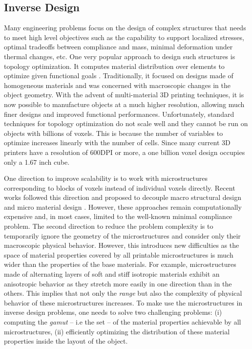 \subsection{Inverse Design}
Many engineering problems focus on the design of complex structures that needs to meet high level objectives such as the capability to support localized stresses, optimal tradeoffs between compliance and mass, minimal deformation under thermal changes, etc. One very popular approach to design such structures is topology optimization. It computes material distribution over elements to optimize given functional goals \cite{bendsoe2004topology}.
Traditionally, it focused on designs made of homogeneous materials and was concerned with macroscopic changes in the object geometry.
With the advent of multi-material 3D printing techniques, it is now possible to manufacture objects at a much higher resolution, allowing much finer designs and improved functional performances.
Unfortunately, standard techniques for topology optimization do not scale well and they cannot be run on objects with billions of voxels. This is because the number of variables to optimize increases linearly with the number of cells. Since many current 3D printers have a resolution of 600DPI or more, a one billion voxel design occupies only a 1.67 inch cube.

One direction to improve scalability is to work with microstructures corresponding to blocks of voxels instead of individual voxels directly. Recent works followed this direction and proposed to decouple macro structural design and micro material design \cite{rodrigues:2002:hierarchical,coelho:2008:hierarchical,nakshatrala:2013:nonlinear}. However, these approaches remain computationally expensive and, in most cases, limited to the well-known minimal compliance problem.
The second direction to reduce the problem complexity is to temporarily ignore the geometry of the microstructures and consider only their macroscopic physical behavior.
However, this introduces new difficulties as the space of material properties covered by all printable microstructures is much wider than the properties of the base materials.
For example, microstructures made of alternating layers of soft and stiff isotropic materials exhibit an anisotropic behavior as they stretch more easily in one direction than in the others.
This implies that not only the {\it range} but also the complexity of physical behavior of these microstructures increases.
To make use the microstructures in inverse design problems, one needs to solve two challenging problems:
(i) computing the {\it gamut} -- i.e the set -- of the material properties achievable by all microstructures, (ii) efficiently optimizing the distribution of these material properties inside the layout of the object.
